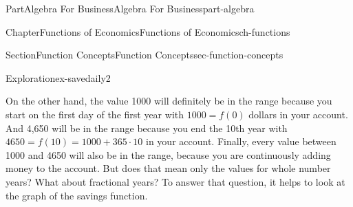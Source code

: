 \documentclass{tufte-book}
\numberwithin{equation}{chapter}
\begin{document}
\begin{partptx}{Part}{Algebra For Business}{}{Algebra For Business}{}{}{part-algebra}
\begin{chapterptx}{Chapter}{Functions of Economics}{}{Functions of Economics}{}{}{ch-functions}
\begin{sectionptx}{Section}{Function Concepts}{}{Function Concepts}{}{}{sec-function-concepts}
\begin{exploration}{Exploration}{}{ex-savedaily2}
\begin{enumerate}[font=\bfseries,label=(\alph*),ref=\alph*]
\par
On the other hand, the value \textdollar{}1000 will definitely be in the range because you start on the first day of the first year with \(1000=f(0)\) dollars in your account. And  \textdollar{}4,650 will be in the range because you end the 10th year with \(4650=f(10)=1000+365\cdot 10\) in your account. Finally, every value between 1000 and 4650 will also be in the range, because you are continuously adding money to the account. But does that mean only the values for whole number years?  What about fractional years?   To answer that question, it helps to look at the graph of the savings function.%
\begin{image}{0}{1}{0}{}%
\end{image}
\end{enumerate}
\end{exploration}
\end{sectionptx}
\end{chapterptx}
\end{partptx}
\end{document}
